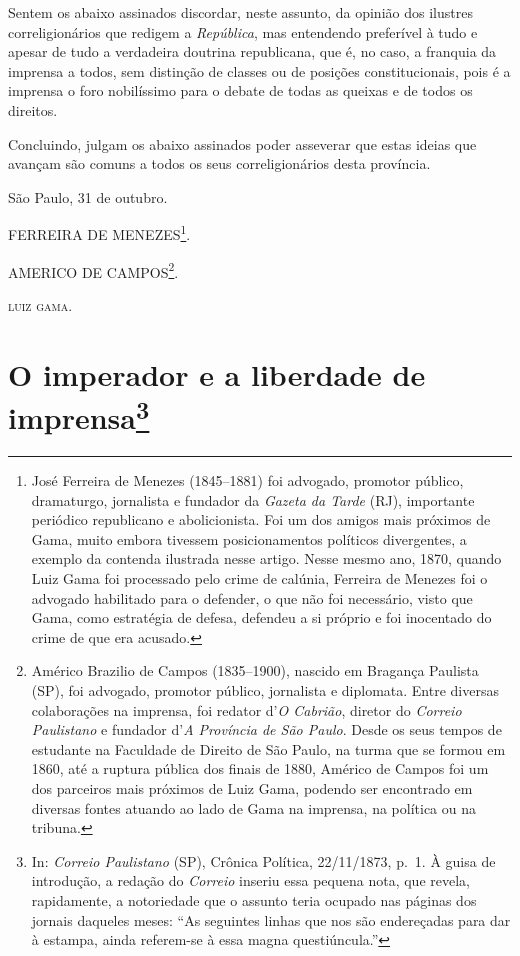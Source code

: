 Sentem os abaixo assinados discordar, neste assunto, da opinião dos
ilustres correligionários que redigem a \emph{República}, mas entendendo
preferível à tudo e apesar de tudo a verdadeira doutrina republicana,
que é, no caso, a franquia da imprensa a todos, sem distinção de classes
ou de posições constitucionais, pois é a imprensa o foro nobilíssimo
para o debate de todas as queixas e de todos os direitos.

Concluindo, julgam os abaixo assinados poder asseverar que estas ideias
que avançam são comuns a todos os seus correligionários desta província.

São Paulo, 31 de outubro.

FERREIRA DE MENEZES\footnote{ José Ferreira de Menezes (1845--1881) foi
  advogado, promotor público, dramaturgo, jornalista e fundador da
  \emph{Gazeta da Tarde} (RJ), importante periódico republicano e
  abolicionista. Foi um dos amigos mais próximos de Gama, muito embora
  tivessem posicionamentos políticos divergentes, a exemplo da contenda
  ilustrada nesse artigo. Nesse mesmo ano, 1870, quando Luiz Gama foi
  processado pelo crime de calúnia, Ferreira de Menezes foi o advogado
  habilitado para o defender, o que não foi necessário, visto que Gama,
  como estratégia de defesa, defendeu a si próprio e foi inocentado do
  crime de que era acusado.}.

AMERICO DE CAMPOS\footnote{ Américo Brazilio de Campos (1835--1900),
  nascido em Bragança Paulista (SP), foi advogado, promotor público,
  jornalista e diplomata. Entre diversas colaborações na imprensa, foi
  redator d'\emph{O Cabrião}, diretor do \emph{Correio Paulistano} e
  fundador d'\emph{A Província de São Paulo}. Desde os seus tempos de
  estudante na Faculdade de Direito de São Paulo, na turma que se formou
  em 1860, até a ruptura pública dos finais de 1880, Américo de Campos
  foi um dos parceiros mais próximos de Luiz Gama, podendo ser
  encontrado em diversas fontes atuando ao lado de Gama na imprensa, na
  política ou na tribuna.}.

\textsc{luiz gama}.

\chapter{O imperador e a liberdade de imprensa\footnote{ In: \emph{Correio Paulistano} (SP), Crônica Política,
  22/11/1873, p.~1. À guisa de introdução, a redação do \emph{Correio}
  inseriu essa pequena nota, que revela, rapidamente, a notoriedade que
  o assunto teria ocupado nas páginas dos jornais daqueles meses: ``As
  seguintes linhas que nos são endereçadas para dar à estampa, ainda
  referem-se à essa magna questiúncula.''}} %

